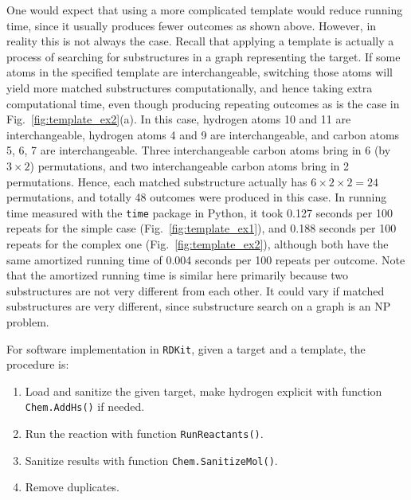 \documentclass{article}
\begin{document}
One would expect that using a more complicated template would reduce running time, since it usually produces fewer outcomes as shown above.
However, in reality this is not always the case. Recall that applying a template is actually a process of searching for substructures in a graph representing the target. 
If some atoms in the specified template are interchangeable, switching those atoms will yield more matched substructures computationally, and hence taking extra computational time, even though producing repeating outcomes as is the case in Fig.~\ref{fig:template_ex2}(a).
In this case, hydrogen atoms 10 and 11 are interchangeable, hydrogen atoms 4 and 9 are interchangeable, and carbon atoms 5, 6, 7 are interchangeable. Three interchangeable carbon atoms bring in 6 (by $3\times2$) permutations, and two interchangeable carbon atoms bring in 2 permutations. 
Hence, each matched substructure actually has $6\times2\times2=24$ permutations, and totally 48 outcomes were produced in this case. 
In running time measured with the \texttt{time} package in Python, it took 0.127 seconds per 100 repeats for the simple case (Fig.~\ref{fig:template_ex1}), and 0.188 seconds per 100 repeats for the complex one (Fig.~\ref{fig:template_ex2}), although both have the same amortized running time of 0.004 seconds per 100 repeats per outcome. 
Note that the amortized running time is similar here primarily because two substructures are not very different from each other. It could vary if matched substructures are very different, since substructure search on a graph is an NP problem. %

For software implementation in \texttt{RDKit}, given a target and a template, the procedure is: 
\begin{enumerate}
    \item Load and sanitize the given target, make hydrogen explicit with function \texttt{Chem.AddHs()} if needed. 
    \item Run the reaction with function \texttt{RunReactants()}. 
    \item Sanitize results with function \texttt{Chem.SanitizeMol()}.
    \item Remove duplicates. 
\end{enumerate}

\end{document}
